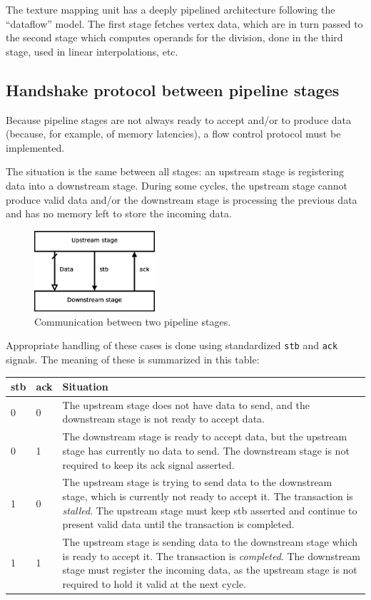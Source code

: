 \documentclass[a4paper,11pt]{article}
\begin{document}
The texture mapping unit has a deeply pipelined architecture following the ``dataflow'' model. The first stage fetches vertex data, which are in turn passed to the second stage which computes operands for the division, done in the third stage, used in linear interpolations, etc.

\subsection{Handshake protocol between pipeline stages}
Because pipeline stages are not always ready to accept and/or to produce data (because, for example, of memory latencies), a flow control protocol must be implemented.

The situation is the same between all stages: an upstream stage is registering data into a downstream stage. During some cycles, the upstream stage cannot produce valid data and/or the downstream stage is processing the previous data and has no memory left to store the incoming data.

\begin{figure}[H]
\centering
\includegraphics[height=30mm]{comm.eps}
\caption{Communication between two pipeline stages.}\label{fig:comm}
\end{figure}

Appropriate handling of these cases is done using standardized \verb!stb! and \verb!ack! signals. The meaning of these is summarized in this table:\\

\begin{tabularx}{\textwidth}{|l|l|X|}
\hline
\bf stb & \bf ack & \bf Situation \\
\hline
0 & 0 & The upstream stage does not have data to send, and the downstream stage is not ready to accept data. \\
\hline
0 & 1 & The downstream stage is ready to accept data, but the upstream stage has currently no data to send. The downstream stage is not required to keep its ack signal asserted. \\
\hline
1 & 0 & The upstream stage is trying to send data to the downstream stage, which is currently not ready to accept it. The transaction is \textit{stalled}. The upstream stage must keep stb asserted and continue to present valid data until the transaction is completed. \\
\hline
1 & 1 & The upstream stage is sending data to the downstream stage which is ready to accept it. The transaction is \textit{completed}. The downstream stage must register the incoming data, as the upstream stage is not required to hold it valid at the next cycle. \\
\hline
\end{tabularx}\\
\end{document}
